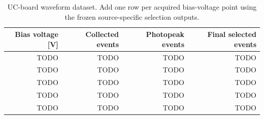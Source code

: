 \begin{table}[H]
    \centering
    \caption{UC-board waveform dataset. Add one row per acquired bias-voltage point using the frozen source-specific selection outputs.}
    \label{tab:uc-board-dataset}
    \begin{tabular}{rrrr}
        \toprule
        Bias voltage [V] & Collected events & Photopeak events & Final selected events \\
        \midrule
        TODO & TODO & TODO & TODO \\
        TODO & TODO & TODO & TODO \\
        TODO & TODO & TODO & TODO \\
        TODO & TODO & TODO & TODO \\
        TODO & TODO & TODO & TODO \\
        \bottomrule
    \end{tabular}
\end{table}
